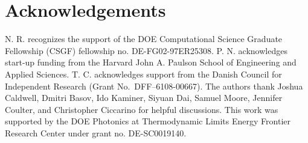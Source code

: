 \documentclass[aps,prb,twocolumn,
	           groupedaddress,superscriptaddress,
               amsfonts,amssymb,amsmath,floatfix,
	           citeautoscript]{revtex4-1}
\begin{document}
%



\section{Acknowledgements}
N. R. recognizes the support of the DOE Computational Science Graduate Fellowship (CSGF) fellowship no. DE-FG02-97ER25308. P. N. acknowledges start-up funding from the Harvard John A. Paulson School of Engineering and Applied Sciences. T. C. acknowledges support from the Danish Council for Independent Research (Grant No.\ DFF--6108-00667). The authors thank Joshua Caldwell, Dmitri Basov, Ido Kaminer, Siyuan Dai, Samuel Moore, Jennifer Coulter, and Christopher Ciccarino for helpful discussions. This work was supported by the DOE Photonics at Thermodynamic Limits Energy Frontier Research Center under grant no. DE-SC0019140.




\end{document}
